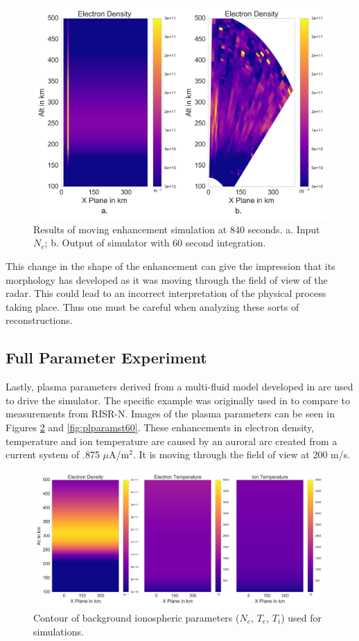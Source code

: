\documentclass[draft,ras]{agutex}
\begin{document}
\begin{article}
\begin{figure}[!t]
\centering
\includegraphics[width=5in]{moving14mins}
\caption{Results of moving enhancement simulation at 840 seconds. a. Input $N_e$; b. Output of simulator with 60 second integration.}
\label{fig:moving14mins}
\end{figure}

This change in the shape of the enhancement can give the impression that its morphology has developed as it was moving through the field of view of the radar. This could lead to an incorrect interpretation of the physical process taking place. Thus one must be careful when analyzing these sorts of reconstructions.

\subsection{Full Parameter Experiment}
Lastly, plasma parameters derived from a multi-fluid model developed in \cite{semeter:plasmatransport2012} are used to drive the simulator. The specific example was originally used in \cite{Perry:2015jf} to compare to measurements from RISR-N. Images of the plasma parameters can be seen in Figures \ref{fig:plparamst0} and \ref{fig:plparamst60}. These enhancements in electron density, temperature and ion temperature are caused by an auroral arc created from a current system of .875 $\mu$A/m$^2$. It is moving through the field of view at 200 m/s.

\begin{figure}[!t]
\centering
\includegraphics[width=5in]{000_inputdata}
\caption{Contour of background ionospheric parameters ($N_e$, $T_e$, $T_i$) used for simulations.}
\label{fig:plparamst0}
\end{figure}


\end{article}
\end{document}
